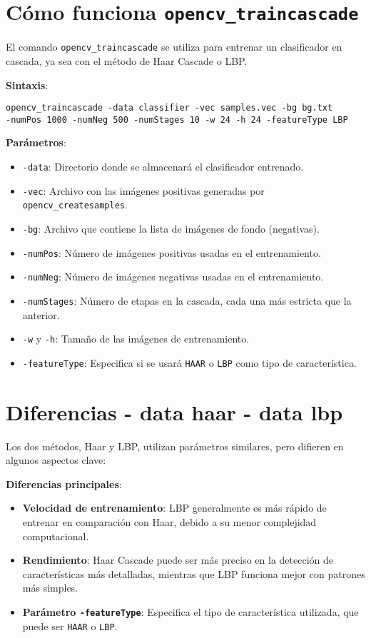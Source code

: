 \documentclass{article}
\begin{document}
\section{Cómo funciona \texttt{opencv\_traincascade}}
El comando \texttt{opencv\_traincascade} se utiliza para entrenar un clasificador en cascada, ya sea con el método de Haar Cascade o LBP.

\textbf{Sintaxis}:
\begin{verbatim}
opencv_traincascade -data classifier -vec samples.vec -bg bg.txt 
-numPos 1000 -numNeg 500 -numStages 10 -w 24 -h 24 -featureType LBP
\end{verbatim}

\textbf{Parámetros}:
\begin{itemize}
    \item \texttt{-data}: Directorio donde se almacenará el clasificador entrenado.
    \item \texttt{-vec}: Archivo con las imágenes positivas generadas por \texttt{opencv\_createsamples}.
    \item \texttt{-bg}: Archivo que contiene la lista de imágenes de fondo (negativas).
    \item \texttt{-numPos}: Número de imágenes positivas usadas en el entrenamiento.
    \item \texttt{-numNeg}: Número de imágenes negativas usadas en el entrenamiento.
    \item \texttt{-numStages}: Número de etapas en la cascada, cada una más estricta que la anterior.
    \item \texttt{-w} y \texttt{-h}: Tamaño de las imágenes de entrenamiento.
    \item \texttt{-featureType}: Especifica si se usará \texttt{HAAR} o \texttt{LBP} como tipo de característica.
\end{itemize}

\section{Diferencias - data haar - data lbp}
Los dos métodos, Haar y LBP, utilizan parámetros similares, pero difieren en algunos aspectos clave:

\textbf{Diferencias principales}:
\begin{itemize}
    \item \textbf{Velocidad de entrenamiento}: LBP generalmente es más rápido de entrenar en comparación con Haar, debido a su menor complejidad computacional.
    \item \textbf{Rendimiento}: Haar Cascade puede ser más preciso en la detección de características más detalladas, mientras que LBP funciona mejor con patrones más simples.
    \item \textbf{Parámetro \texttt{-featureType}}: Especifica el tipo de característica utilizada, que puede ser \texttt{HAAR} o \texttt{LBP}.
\end{itemize}
\end{document}

